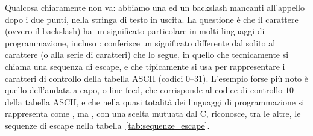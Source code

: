Qualcosa chiaramente non va: abbiamo una  ed un backslash mancanti all'appello
dopo i due punti, nella stringa di testo in uscita. La questione \`e che il carattere
\cchar{\textbackslash} (ovvero il backslash) ha un significato particolare in molti
linguaggi di programmazione, incluso \python: conferisce un significato differente
dal solito al carattere (o alla serie di caratteri) che lo segue, in quello che
tecnicamente si chiama una sequenza di escape, e che tipicamente si usa per rappresentare
i caratteri di controllo della tabella ASCII (codici $0$--$31$). L'esempio forse
pi\`u noto \`e quello dell'andata a capo, o line feed, che corrisponde al codice di
controllo $10$ della tabella ASCII, e che nella quasi totalit\`a dei linguaggi di
programmazione si rappresenta come , ma \python, con una
scelta mutuata dal C, riconosce, tra le altre, le sequenze di escape nella
tabella~\ref{tab:sequenze_escape}.

\begin{table}[!htb]
\end{table}

